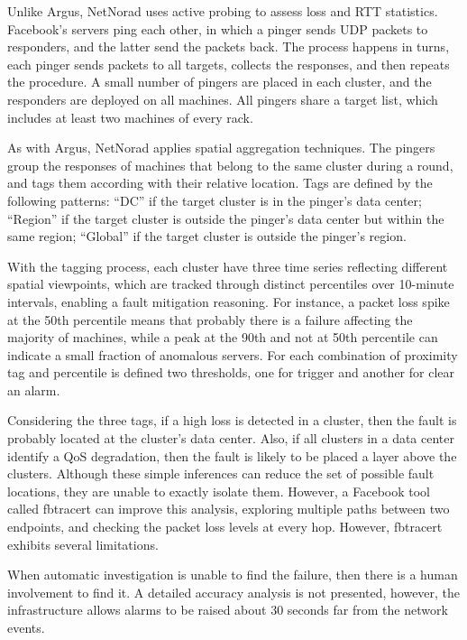 Unlike Argus, NetNorad uses active probing to assess loss and RTT statistics.
Facebook's servers ping each other, in which
a pinger sends UDP packets to responders, and the latter
send the packets back. The process happens in turns, each pinger
sends packets to all targets, collects the responses, and then repeats
the procedure. A small number of pingers are placed in each cluster,
and the responders are
deployed on all machines. All pingers share a target list, which includes
at least two machines of every rack.

As with Argus, NetNorad applies spatial aggregation techniques.
The pingers group the responses of machines that belong to the same cluster
during a round, and tags them according with their relative location.
Tags are defined by the following patterns:
``DC'' if the target cluster is in the pinger's data center;
``Region'' if the target cluster is outside the pinger's
data center but within the same region;
``Global'' if the target cluster is outside the pinger's
region.

With the tagging process, each cluster have three time series reflecting
different spatial viewpoints, which are tracked through
distinct percentiles over 10-minute
intervals, enabling a fault mitigation reasoning.
For instance, a packet loss spike at the
50th percentile means that probably there is a failure affecting the majority of
machines, while a peak at the 90th and not at 50th
percentile can indicate a small fraction of anomalous servers.
For each combination of proximity tag and percentile is defined two
thresholds, one for trigger and another for clear an alarm.

Considering the three tags, if a high loss is detected in a cluster,
then the fault is probably located at the cluster's data center.
Also, if all clusters in a data center identify a QoS degradation,
then the fault is likely to be placed a layer above the clusters.
Although these simple inferences can reduce the set of possible fault locations,
they are unable to exactly isolate them.
However, a Facebook tool called fbtracert
can improve this analysis, exploring multiple
paths between two endpoints, and checking the
packet loss levels at every hop. However, fbtracert exhibits several
limitations.

When automatic investigation is unable to find the failure, then there
is a human involvement to find it. A detailed accuracy analysis is not
presented, however, the infrastructure allows alarms to be raised about 30
seconds far from the network events.

